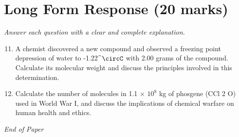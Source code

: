 \documentclass[12pt]{article}
\begin{document}
\section*{Long Form Response (20 marks)}
\textit{Answer each question with a clear and complete explanation.}
\begin{enumerate}[label=\arabic*.]
\setcounter{enumi}{10}
\item A chemist discovered a new compound and observed a freezing point depression of water to -1.22^\ensuremath{\circC} with 2.00 grams of the compound. Calculate its molecular weight and discuss the principles involved in this determination.
\item Calculate the number of molecules in 1.1 \ensuremath{\times} $10^8$ kg of phosgene (CCl 2 O) used in World War I, and discuss the implications of chemical warfare on human health and ethics.
\end{enumerate}

\vfill
\noindent\textit{End of Paper}
\end{document}
